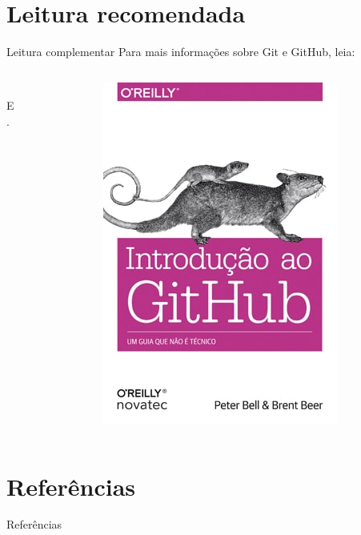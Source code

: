 \documentclass{beamer}
\begin{document}
\section{Leitura recomendada}
\begin{frame}{Leitura complementar}
 Para mais informações sobre Git e GitHub, leia:\\
  \vspace{0.6cm}
 \begin{columns}
   \begin{column}{0.4\textwidth}
 \cite{githubpages2022}\\
 E\\
 \cite{beer2015github}.
   \end{column}
   \begin{column}{0.4\textwidth}
    \includegraphics[height=0.7\paperheight]{introgit.jpg} \\
   \end{column}

 \end{columns}
\end{frame}

\section{Referências}

\begin{frame}{Referências}%
\small
\begin{center}
\tiny


\end{center}
\end{frame}
\end{document}
